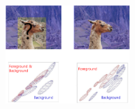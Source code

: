 \documentclass[notheorems,mathserif,table,compress]{beamer}  %
\begin{document}
\begin{frame}
\begin{columns}
      \begin{column}[c]{0.6\textwidth}
          \begin{figure}[!ht]
          \centering
          \includegraphics[width=1.9in]{fore_back.png}
          \end{figure}
      \end{column}
   \end{columns}
\end{frame}
\end{document}
